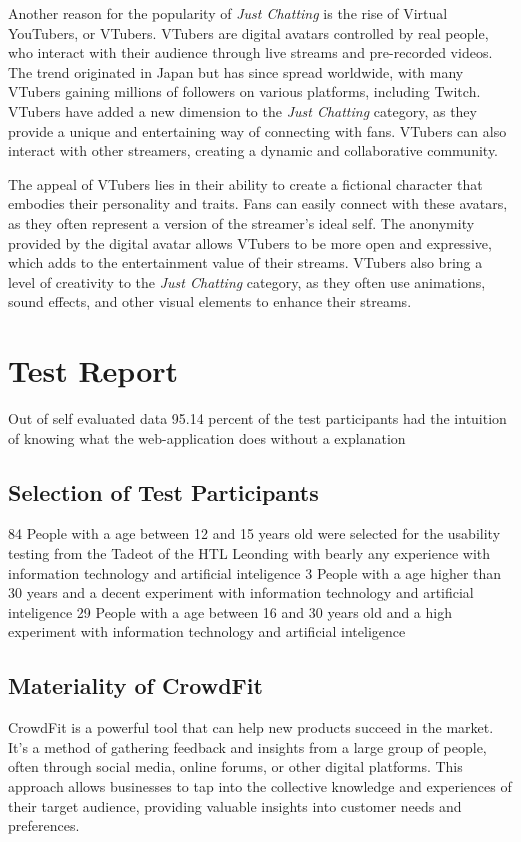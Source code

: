 Another reason for the popularity of \emph{Just Chatting} is the rise of Virtual YouTubers, or VTubers. VTubers are 
digital avatars controlled by real people, who interact with their audience through live streams and pre-recorded videos. 
The trend originated in Japan but has since spread worldwide, with many VTubers gaining millions of followers on various 
platforms, including Twitch. VTubers have added a new dimension to the \emph{Just Chatting} category, as they provide a unique 
and entertaining way of connecting with fans. VTubers can also interact with other streamers, creating a dynamic and collaborative community.

The appeal of VTubers lies in their ability to create a fictional character that embodies their personality and traits. 
Fans can easily connect with these avatars, as they often represent a version of the streamer's ideal self. The anonymity 
provided by the digital avatar allows VTubers to be more open and expressive, which adds to the entertainment value of their 
streams. VTubers also bring a level of creativity to the \emph{Just Chatting} category, as they often use animations, sound effects, 
and other visual elements to enhance their streams.

\section{Test Report}
Out of self evaluated data 95.14 percent of the test participants had the intuition of knowing what the web-application does without a explanation

\subsection{Selection of Test Participants}
84 People with a age between 12 and 15 years old were selected for the usability testing from the Tadeot of the HTL Leonding with bearly any experience with information technology and artificial inteligence
3 People with a age higher than 30 years and a decent experiment with information technology and artificial inteligence
29 People with a age between 16 and 30 years old and a high experiment with information technology and artificial inteligence

\subsection{Materiality of CrowdFit}
CrowdFit is a powerful tool that can help new products succeed in the market. It's a method of gathering feedback and insights from a 
large group of people, often through social media, online forums, or other digital platforms. This approach allows businesses 
to tap into the collective knowledge and experiences of their target audience, providing valuable insights into customer needs and preferences.

